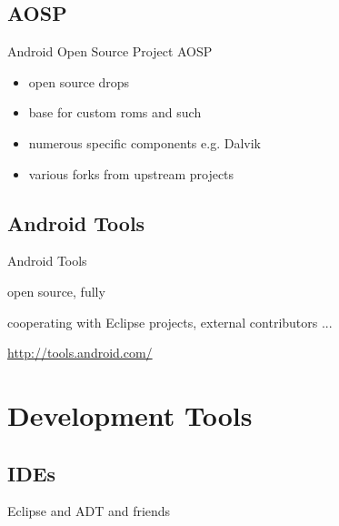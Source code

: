 \documentclass[aspectratio=169]{beamer}
\newcommand{\surl}[1] {{\tiny \url{#1}}}
\begin{document}
  \subsection{AOSP}
    \begin{frame}{Android Open Source Project AOSP}
      \begin{itemize}
        \item<1->open source drops
        \item<2->base for custom roms and such
        \item<3->numerous specific components e.g. Dalvik
        \item<4->various forks from upstream projects
      \end{itemize}
    \end{frame}

  \subsection{Android Tools}
    \begin{frame}{Android Tools}
      \begin{description}
        \item<1->open source, fully 
        \item<2->cooperating with Eclipse projects, external contributors ...
        \item<3->\surl{http://tools.android.com/}
      \end{description}
    \end{frame}

\section{Development Tools}

  \subsection{IDEs}

    \begin{frame}{Eclipse and ADT and friends}
      
    \end{frame}
\end{document}
